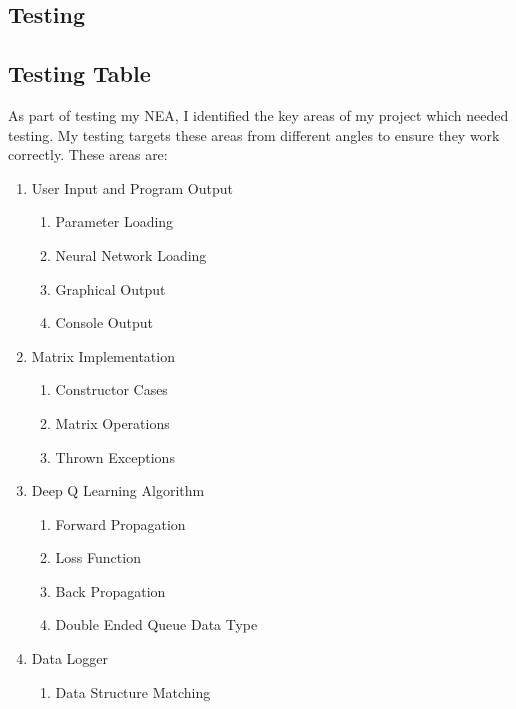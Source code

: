 \begin{flushleft}
    \Large
    \section{Testing}
    
    \subsection{Testing Table}
    \vspace{0.5cm}
    
    \large
    As part of testing my NEA, I identified the key areas of my project which needed testing.
    My testing targets these areas from different angles to ensure they work correctly. 
    These areas are:
    \begin{enumerate}
        \item User Input and Program Output
            \begin{enumerate}
                \item Parameter Loading
                \item Neural Network Loading
                \item Graphical Output
                \item Console Output
            \end{enumerate}
        \item Matrix Implementation
            \begin{enumerate}
                \item Constructor Cases
                \item Matrix Operations
                \item Thrown Exceptions
            \end{enumerate}
        \item Deep Q Learning Algorithm
            \begin{enumerate}
                \item Forward Propagation
                \item Loss Function
                \item Back Propagation
                \item Double Ended Queue Data Type
            \end{enumerate}
        \item Data Logger
            \begin{enumerate}
                \item Data Structure Matching

\end{enumerate}
\end{enumerate}
\end{flushleft}
